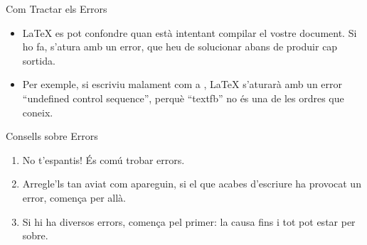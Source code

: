 \begin{frame}[fragile]{Com Tractar els Errors}
\begin{itemize}
\item \LaTeX{} es pot confondre quan està intentant compilar el vostre document.
    Si ho fa, s'atura amb un error, que heu de solucionar abans de produir cap sortida.
\item Per exemple, si escriviu malament  com a , \LaTeX{} s'aturarà amb un error
``undefined control sequence'', perquè ``textfb'' no és una de les ordres que coneix.
\end{itemize}
\begin{block}{Consells sobre Errors}
\begin{enumerate}
\item No t'espantis! És comú trobar errors.
\item Arregle'ls tan aviat com apareguin, si el que acabes d'escriure ha provocat un error, comença per allà.
\item Si hi ha diversos errors, comença pel primer:
la causa fins i tot pot estar per sobre.
\end{enumerate}
\end{block}
\end{frame}


